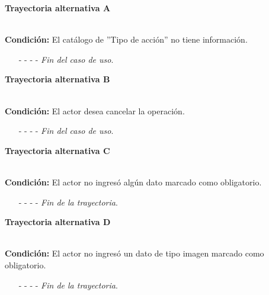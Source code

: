 \hypertarget{CU11-1-1-1:TAA}{\textbf{Trayectoria alternativa A}}\\
\noindent \textbf{Condición:} El catálogo de ''Tipo de acción'' no tiene información.
\begin{enumerate}
	\UCpaso[\UCsist] Muestra el mensaje  en la pantalla  para indicar que no es posible realizar la operación debido a la falta de información necesaria para el sistema.
	\item[- -] - - {\em {Fin del caso de uso}}.%
\end{enumerate}
\hypertarget{CU11-1-1-1:TAB}{\textbf{Trayectoria alternativa B}}\\
\noindent \textbf{Condición:} El actor desea cancelar la operación.
\begin{enumerate}
	\UCpaso[\UCactor] Solicita cancelar la operación oprimiendo el botón  de la pantalla .
	\UCpaso[\UCsist] Muestra la pantalla .
	\item[- -] - - {\em {Fin del caso de uso}}.%
\end{enumerate}
\hypertarget{CU11-1-1-1:TAC}{\textbf{Trayectoria alternativa C}}\\
\noindent \textbf{Condición:} El actor no ingresó algún dato marcado como obligatorio.
\begin{enumerate}
	\UCpaso[\UCsist] Muestra el mensaje  señalando el campo que presenta el error en la pantalla .
	\UCpaso Regresa al paso \ref{CU11.1.1-P3} de la trayectoria principal.
	\item[- -] - - {\em {Fin de la trayectoria}}.%
\end{enumerate}
\hypertarget{CU11-1-1-1:TAD}{\textbf{Trayectoria alternativa D}}\\
\noindent \textbf{Condición:} El actor no ingresó un dato de tipo imagen marcado como obligatorio.
\begin{enumerate}
	\UCpaso[\UCsist] Muestra el mensaje  señalando el campo que presenta el error en la pantalla .
	\UCpaso Regresa al paso \ref{CU11.1-P3} de la trayectoria principal.
	\item[- -] - - {\em {Fin de la trayectoria}}.%
\end{enumerate}
